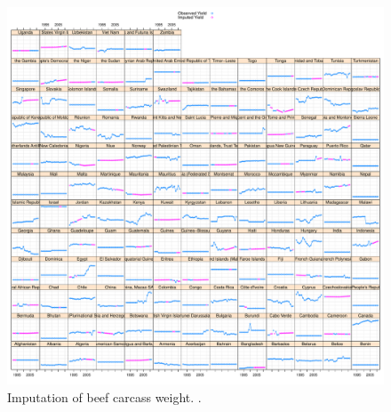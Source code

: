 \documentclass[nojss]{jss}\usepackage[]{graphicx}\usepackage[]{color}
\makeatletter
\def\maxwidth{ %
  \ifdim\Gin@nat@width>\linewidth
    \linewidth
  \else
    \Gin@nat@width
  \fi
}
\newenvironment{knitrout}{}{} %
\makeatother
\begin{document}
\begin{knitrout}
\color{fgcolor}\begin{figure}[!ht]


{\centering \includegraphics[width=\maxwidth]{figure/beef-yield-imputed} 

}

\caption[Imputation of beef carcass weight]{Imputation of beef carcass weight. .\label{fig:beef-yield-imputed}}
\end{figure}


\end{knitrout}
\end{document}
